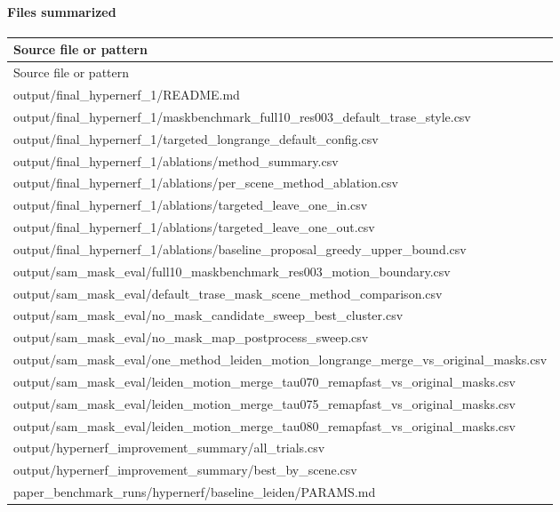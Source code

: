 \documentclass[10pt]{article}
\begin{document}
\paragraph{Files summarized}
\small
\begin{longtable}{p{15cm}}
\toprule
Source file or pattern \\
\midrule
\endfirsthead
\toprule
Source file or pattern \\
\midrule
\endhead
output/final\_hypernerf\_1/README.md \\
output/final\_hypernerf\_1/maskbenchmark\_full10\_res003\_default\_trase\_style.csv \\
output/final\_hypernerf\_1/targeted\_longrange\_default\_config.csv \\
output/final\_hypernerf\_1/ablations/method\_summary.csv \\
output/final\_hypernerf\_1/ablations/per\_scene\_method\_ablation.csv \\
output/final\_hypernerf\_1/ablations/targeted\_leave\_one\_in.csv \\
output/final\_hypernerf\_1/ablations/targeted\_leave\_one\_out.csv \\
output/final\_hypernerf\_1/ablations/baseline\_proposal\_greedy\_upper\_bound.csv \\
output/sam\_mask\_eval/full10\_maskbenchmark\_res003\_motion\_boundary.csv \\
output/sam\_mask\_eval/default\_trase\_mask\_scene\_method\_comparison.csv \\
output/sam\_mask\_eval/no\_mask\_candidate\_sweep\_best\_cluster.csv \\
output/sam\_mask\_eval/no\_mask\_map\_postprocess\_sweep.csv \\
output/sam\_mask\_eval/one\_method\_leiden\_motion\_longrange\_merge\_vs\_original\_masks.csv \\
output/sam\_mask\_eval/leiden\_motion\_merge\_tau070\_remapfast\_vs\_original\_masks.csv \\
output/sam\_mask\_eval/leiden\_motion\_merge\_tau075\_remapfast\_vs\_original\_masks.csv \\
output/sam\_mask\_eval/leiden\_motion\_merge\_tau080\_remapfast\_vs\_original\_masks.csv \\
output/hypernerf\_improvement\_summary/all\_trials.csv \\
output/hypernerf\_improvement\_summary/best\_by\_scene.csv \\
paper\_benchmark\_runs/hypernerf/baseline\_leiden/PARAMS.md \\

\end{longtable}
\end{document}
